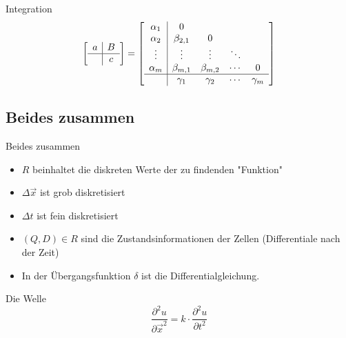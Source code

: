 \documentclass{beamer}
\begin{document}
\begin{frame}{Integration}
\[
\begin{bmatrix}
\begin{array}{c|c}
a & B\\
\hline     & c \\
\end{array}
\end{bmatrix} = \begin{bmatrix}
\begin{array}{c|cccc}
  \alpha_1 & 0  \\
  \alpha_2    & \beta_{2,1} & 0\\
  \vdots & \vdots & \vdots& \ddots\\
  \alpha_m    & \beta_{m,1} & \beta_{m,2}& \cdots & 0\\
  \hline & \gamma_1    & \gamma_2   & \cdots & \gamma_m\\
\end{array}

\end{bmatrix}
\]
\end{frame}

\subsection{Beides zusammen}

\begin{frame}{Beides zusammen}
\begin{itemize}
\item $R$ beinhaltet die diskreten Werte der zu findenden "Funktion"
\item $\Delta \vec{x}$ ist grob diskretisiert
\item $\Delta t$ ist fein diskretisiert
\item $(Q, D) \in R$ sind die Zustandsinformationen der Zellen (Differentiale nach der Zeit)
\item In der Übergangsfunktion $\delta$ ist die Differentialgleichung.
\end{itemize}

\end{frame}

\begin{frame}{Die Welle}
\[
\frac {\partial^2 u} {\partial \vec x^2} = k \cdot \frac {\partial^2 u}{\partial t^2}
\]
\end{frame}
\end{document}
